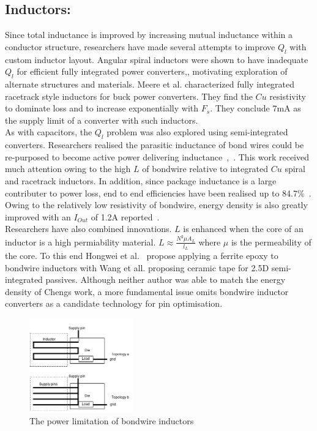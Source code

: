 \documentclass[letterpaper,twocolumn,10pt]{article}
\begin{document}
\subsection{Inductors: }Since total inductance is improved by increasing mutual inductance within a conductor structure, researchers have made several attempts to improve $Q_l$ with custom inductor layout. Angular spiral inductors were shown to have inadequate $Q_l$ for efficient fully integrated power converters\cite{Alimadadi2008},\cite{Artillan2011}, motivating exploration of alternate structures and materials. Meere et al. \cite{Meere2009} characterized fully integrated racetrack style inductors for buck power converters. They find the $Cu$ resistivity to dominate loss and to increase exponentially with $F_s$. They conclude 7mA as the supply limit of a converter with such inductors.\\
As with capacitors, the $Q_l$ problem was also explored using semi-integrated converters. Researchers realised the parasitic inductance of bond wires could be re-purposed to become active power delivering inductance~\cite{Wens2007},~\cite{Ahn2012}. This work received much attention owing to the high $L$ of bondwire relative to integrated $Cu$ spiral and racetrack inductors. In addition, since package inductance is a large contributer to power loss, end to end efficiencies have been realised up to 84.7\%~\cite{Cheng2013}. Owing to the relatively low resistivity of bondwire, energy density is also greatly improved with an $I_{Out}$ of 1.2A reported~\cite{Cheng2013}.\\
\indent Researchers have also combined innovations. $L$ is enhanced when the core of an inductor is a high permiability material. $L \approx \frac{N^2\mu A_L}{l_L}$ where $\mu$ is the permeability of the core. To this end Hongwei et al.~\cite{Hongwei2011} propose applying a ferrite epoxy to bondwire inductors with Wang et all. proposing ceramic tape for 2.5D semi-integrated passives. Although neither author was able to match the energy density of Chengs work, a more fundamental issue omits bondwire inductor converters as a candidate technology for pin optimisation.
    
\begin{figure}[here]
\includegraphics[width=0.4\textwidth]{CostvsGainofBondWireInductor}
\caption{The power limitation of bondwire inductors}
\label{BondWireLim}
\end{figure}
\end{document}
